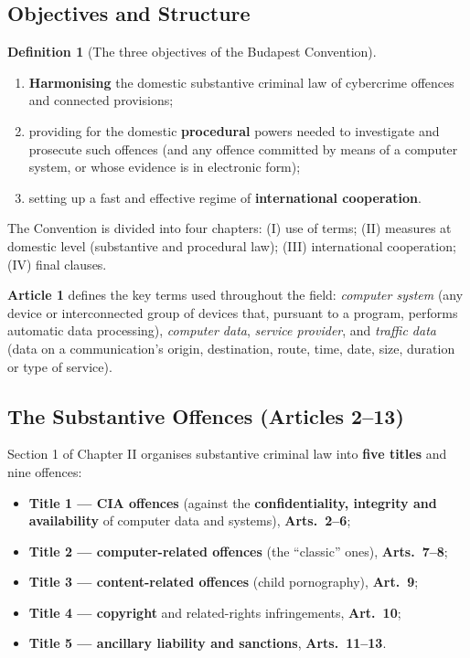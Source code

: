 \documentclass[11pt,a4paper,openany]{report}
\theoremstyle{definition}
\newtheorem{definition}{Definition}[chapter]
\theoremstyle{plain}
\theoremstyle{remark}
\begin{document}
\subsection{Objectives and Structure}

\begin{definition}[The three objectives of the Budapest Convention]
\begin{enumerate}
    \item \textbf{Harmonising} the domestic substantive criminal law of cybercrime offences and connected provisions;
    \item providing for the domestic \textbf{procedural} powers needed to investigate and prosecute such offences (and any offence committed by means of a computer system, or whose evidence is in electronic form);
    \item setting up a fast and effective regime of \textbf{international cooperation}.
\end{enumerate}
\end{definition}

The Convention is divided into four chapters: (I) use of terms; (II) measures at domestic level (substantive and procedural law); (III) international cooperation; (IV) final clauses.

\textbf{Article 1} defines the key terms used throughout the field: \emph{computer system} (any device or interconnected group of devices that, pursuant to a program, performs automatic data processing), \emph{computer data}, \emph{service provider}, and \emph{traffic data} (data on a communication's origin, destination, route, time, date, size, duration or type of service).

\subsection{The Substantive Offences (Articles 2--13)}

Section 1 of Chapter II organises substantive criminal law into \textbf{five titles} and nine offences:
\begin{itemize}
    \item \textbf{Title 1 --- CIA offences} (against the \textbf{confidentiality, integrity and availability} of computer data and systems), \textbf{Arts.\ 2--6};
    \item \textbf{Title 2 --- computer-related offences} (the ``classic'' ones), \textbf{Arts.\ 7--8};
    \item \textbf{Title 3 --- content-related offences} (child pornography), \textbf{Art.\ 9};
    \item \textbf{Title 4 --- copyright} and related-rights infringements, \textbf{Art.\ 10};
    \item \textbf{Title 5 --- ancillary liability and sanctions}, \textbf{Arts.\ 11--13}.
\end{itemize}
\end{document}
